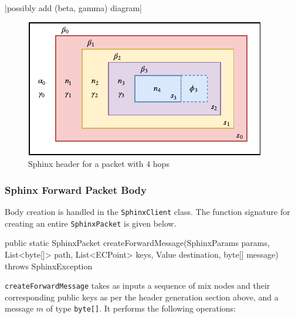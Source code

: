 \documentclass[12pt,a4paper,twoside,openright]{report}
\begin{document}
|possibly add (beta, gamma) diagram|


\begin{figure}[h]
	\includegraphics[width=\linewidth]{figs/sphinx_header}
	\caption{Sphinx header for a packet with 4 hops}\label{fig:sphinx_header}
\end{figure}

\subsubsection{Sphinx Forward Packet Body}

Body creation is handled in the \verb|SphinxClient| class.  The function signature for creating an entire \verb|SphinxPacket| is given below.

\begin{javacode}
public static SphinxPacket createForwardMessage(SphinxParams params,
	List<byte[]> path,
	List<ECPoint> keys,
	Value destination,
	byte[] message) throws SphinxException
\end{javacode}

\verb|createForwardMessage| takes as inputs a sequence of mix nodes and their corresponding public keys as per the header generation section above, and a message $m$ of type \verb|byte[]|. It performs the following operations:
\end{document}
